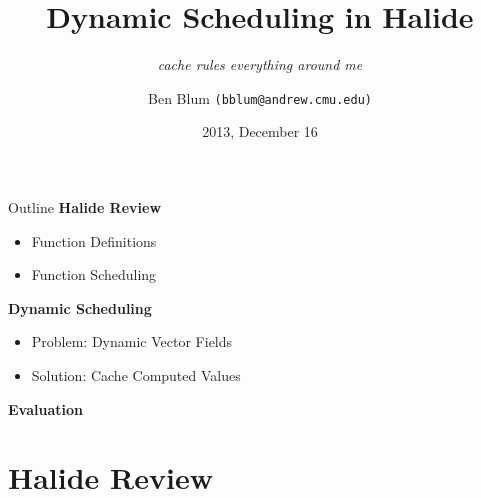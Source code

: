 \documentclass[xcolor=dvipsnames]{beamer}
\title[Dynamic Scheduling in Halide]{{\bf Dynamic Scheduling in Halide}}
\subtitle[]{ {\em cache rules everything around me}}
\author[Ben Blum]{Ben Blum \texttt{(bblum@andrew.cmu.edu)}}
\institute[CMU]{Carnegie Mellon University}
\date[]{2013, December 16}
\begin{document}
\renewcommand{\inserttotalframenumber}{28}
\normalem
\begin{frame}
	\titlepage
\end{frame}


\newcommand\linegap{\vspace{0.2in}}
\newcommand\breakslide[1]{\begin{frame}{} \begin{center} \Large #1 \end{center} \end{frame}}
\newcommand\related[1]{\textsuperscript{\em [#1]}}
\newcommand\hilight[2]{\color{#1}#2\color{black}}

\begin{frame}{Outline}
	\textbf{Halide Review}
	\begin{itemize}
		\item Function Definitions
		\item Function Scheduling
	\end{itemize}
	\linegap

	{\bf Dynamic Scheduling}
	\begin{itemize}
		\item Problem: Dynamic Vector Fields
		\item Solution: Cache Computed Values
	\end{itemize}
	\linegap

	{\bf Evaluation}
\end{frame}

\section{Halide Review}

\newcommand\code[1]{{\begin{center}\fbox{\begin{tabular}{l} #1 \end{tabular}} \end{center}}}

\end{document}
